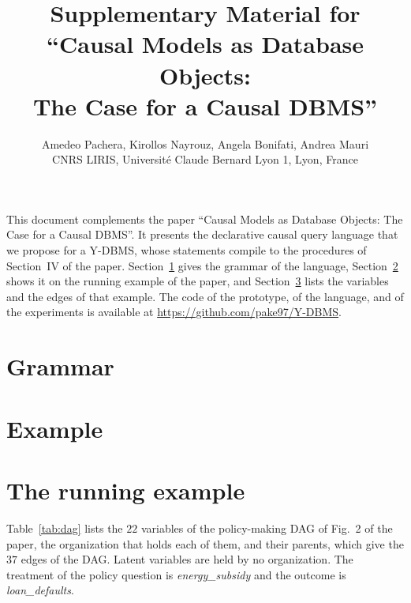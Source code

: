 \documentclass[a4paper,11pt]{article}
\title{Supplementary Material for ``Causal Models as Database Objects:\\
The Case for a Causal DBMS''}
\author{Amedeo Pachera, Kirollos Nayrouz, Angela Bonifati, Andrea Mauri\\[2pt]
\normalsize CNRS LIRIS, Universit\'e Claude Bernard Lyon 1, Lyon, France}
\date{}
\begin{document}
\maketitle

\noindent This document complements the paper ``Causal Models as Database
Objects: The Case for a Causal DBMS''. It presents the declarative causal
query language that we propose for a Y-DBMS, whose statements compile to the
procedures of Section~IV of the paper. Section~\ref{sec:grammar} gives the
grammar of the language, Section~\ref{sec:example} shows it on the running
example of the paper, and Section~\ref{sec:dag} lists the variables and the
edges of that example. The code of the prototype, of the language, and of the
experiments is available at \url{https://github.com/pake97/Y-DBMS}.

\section{Grammar}\label{sec:grammar}


\section{Example}\label{sec:example}


\section{The running example}\label{sec:dag}

Table~\ref{tab:dag} lists the $22$ variables of the policy-making DAG of
Fig.~2 of the paper, the organization that holds each of them, and their
parents, which give the $37$ edges of the DAG. Latent variables are held by
no organization. The treatment of the policy question is
\textit{energy\_subsidy} and the outcome is \textit{loan\_defaults}.
\end{document}
